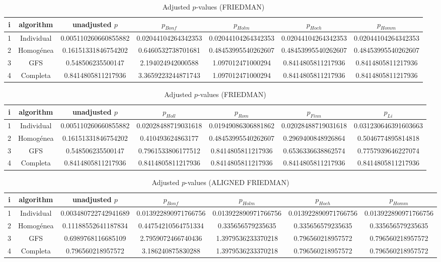 \documentclass[a4paper,10pt]{article}
\begin{document}
\begin{landscape}
\begin{table}[!htp]
\centering\scriptsize
\caption{Adjusted $p$-values (FRIEDMAN)}
\begin{tabular}{ccccccc}
i&algorithm&unadjusted $p$&$p_{Bonf}$&$p_{Holm}$&$p_{Hoch}$&$p_{Homm}$\\
\hline
1&Individual&0.005110260660855882&0.02044104264342353&0.02044104264342353&0.02044104264342353&0.02044104264342353\\
2&Homogénea&0.16151331846754202&0.6460532738701681&0.48453995540262607&0.48453995540262607&0.48453995540262607\\
3&GFS&0.548506235500147&2.194024942000588&1.097012471000294&0.8414805811217936&0.8414805811217936\\
4&Completa&0.8414805811217936&3.3659223244871743&1.097012471000294&0.8414805811217936&0.8414805811217936\\
\hline
\end{tabular}
\end{table}

\begin{table}[!htp]
\centering\scriptsize
\caption{Adjusted $p$-values (FRIEDMAN)}
\begin{tabular}{ccccccc}
i&algorithm&unadjusted $p$&$p_{Holl}$&$p_{Rom}$&$p_{Finn}$&$p_{Li}$\\
\hline
1&Individual&0.005110260660855882&0.02028488719031618&0.01949086306881862&0.02028488719031618&0.031230646391603663\\
2&Homogénea&0.16151331846754202&0.410493624863177&0.48453995540262607&0.2969400848926864&0.5046774895814818\\
3&GFS&0.548506235500147&0.7961533806177512&0.8414805811217936&0.6536336638862574&0.7757939646227074\\
4&Completa&0.8414805811217936&0.8414805811217936&0.8414805811217936&0.8414805811217936&0.8414805811217936\\
\hline
\end{tabular}
\end{table}


\newpage

\begin{table}[!htp]
\centering\scriptsize
\caption{Adjusted $p$-values (ALIGNED FRIEDMAN)}
\begin{tabular}{ccccccc}
i&algorithm&unadjusted $p$&$p_{Bonf}$&$p_{Holm}$&$p_{Hoch}$&$p_{Homm}$\\
\hline
1&Individual&0.003480722742941689&0.013922890971766756&0.013922890971766756&0.013922890971766756&0.013922890971766756\\
2&Homogénea&0.11188552641187834&0.44754210564751334&0.335656579235635&0.335656579235635&0.335656579235635\\
3&GFS&0.6989768116685109&2.7959072466740436&1.3979536233370218&0.796560218957572&0.796560218957572\\
4&Completa&0.796560218957572&3.186240875830288&1.3979536233370218&0.796560218957572&0.796560218957572\\
\hline
\end{tabular}
\end{table}


\end{landscape}
\end{document}
